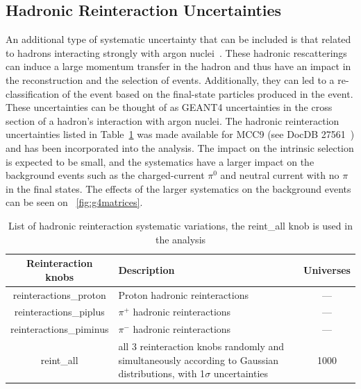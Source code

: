 \subsection{Hadronic Reinteraction Uncertainties }
An additional type of systematic uncertainty that can be included is that related to hadrons interacting strongly with argon nuclei~\cite{bib:reintslides}. These hadronic rescatterings can induce a large momentum transfer in the hadron and thus have an impact in the reconstruction and the selection of events. Additionally, they can led to a re-classification of the event based on the final-state particles produced in the event. These uncertainties can be thought of as GEANT4 uncertainties in the cross section of a hadron's interaction with argon nuclei. The hadronic reinteraction uncertainties listed in Table~\ref{tab:fluxsyst} was made available for MCC9 (see DocDB 27561~\cite{bib:g4uncertainties}) and has been incorporated into the analysis. The impact on the \nue intrinsic selection is expected to be small, and the systematics have a larger impact on the background events such as the charged-current $\pi^0$ and neutral current with no $\pi$ in the final states. The effects of the larger systematics on the background events can be seen on ~\cref{fig:g4matrices}.

\begin{table}[H]
\centering
 \begin{tabular}{| c | m{6cm} | c |} 
    \hline
\hline
Reinteraction knobs & Description & Universes \\
\hline
reinteractions\_proton        &  Proton hadronic reinteractions  & ---\\ 
reinteractions\_piplus   &  $\pi^+$ hadronic reinteractions & ---\\ 
reinteractions\_piminus        & $\pi^-$ hadronic reinteractions  & ---\\
\hline
reint\_all                    &  all 3 reinteraction knobs randomly and simultaneously according to Gaussian distributions, with 1$\sigma$ uncertainties  & 1000 \\
\hline
\end{tabular}
\caption{List of hadronic reinteraction systematic variations, the reint\_all knob is used in the analysis}
\label{tab:fluxsyst}
\end{table}

